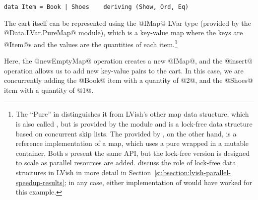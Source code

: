 \singlespacing
\begin{lstlisting}
data Item = Book | Shoes    deriving (Show, Ord, Eq)
\end{lstlisting}
\doublespacing

The cart itself can be represented using the @IMap@ LVar type
(provided by the @Data.LVar.PureMap@ module), which is a key-value map
where the keys are @Item@s and the values are the quantities of each
item.\footnote{The ``Pure'' in  distinguishes it
  from LVish's other map data structure, which is also called
  , but is provided by the  module and is
  a lock-free data structure based on concurrent skip lists.  The
   provided by , on the other hand, is
  a reference implementation of a map, which uses a pure 
  wrapped in a mutable container.  Both s present the same
  API, but the lock-free version is designed to scale as parallel
  resources are added.   discuss the role of lock-free data
  structures in LVish in more detail in
  Section~\ref{subsection:lvish-parallel-speedup-results}; in any
  case, either implementation of  would have worked for this
  example.}


\singlespacing

\doublespacing

Here, the @newEmptyMap@ operation creates a new @IMap@, and the
@insert@ operation allows us to add new key-value pairs to the cart.
In this case, we are concurrently adding the @Book@ item with a
quantity of @2@, and the @Shoes@ item with a quantity of @1@.

